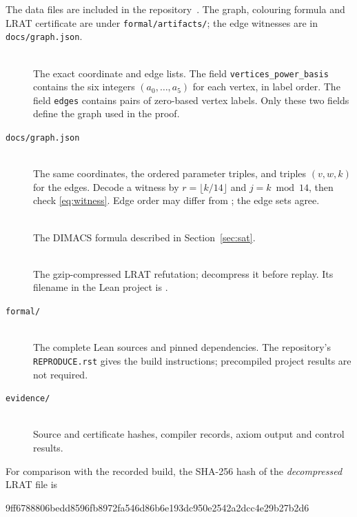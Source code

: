 \documentclass[11pt,a4paper]{article}
\theoremstyle{remark}
\newcommand{\code}[1]{\texttt{#1}}
\begin{document}
The data files are included in the repository~\cite{artifact}.
The graph, colouring formula and LRAT certificate are under
\code{formal/artifacts/}; the edge witnesses are in \code{docs/graph.json}.
\begin{description}
\item[]\hfill\\
The exact coordinate and edge lists.
The field \code{vertices\_power\_basis} contains the six integers
$(a_0,\ldots,a_5)$ for each vertex, in label order. The field \code{edges}
contains pairs of zero-based vertex labels. Only these two fields define
the graph used in the proof.
\item[\code{docs/graph.json}]\hfill\\
The same coordinates, the ordered
parameter triples, and triples $(v,w,k)$ for the edges. Decode a witness
by $r=\lfloor k/14\rfloor$ and $j=k\bmod14$, then check
\eqref{eq:witness}. Edge order may differ from ; the
edge sets agree.
\item[]\hfill\\
The DIMACS formula described in
Section~\ref{sec:sat}.
\item[]\hfill\\
The gzip-compressed LRAT refutation;
decompress it before replay. Its filename in the Lean project is
.
\item[\code{formal/}]\hfill\\
The complete Lean sources and pinned dependencies.
The repository's \code{REPRODUCE.rst} gives the build instructions;
precompiled project results are not required.
\item[\code{evidence/}]\hfill\\
Source and certificate hashes, compiler records,
axiom output and control results.
\end{description}

For comparison with the recorded build, the SHA-256 hash of the
\emph{decompressed} LRAT file is
\begin{center}\small\ttfamily
9ff6788806bedd8596fb8972fa546d86b6e193dc950e2542a2dcc4e29b27b2d6
\end{center}
\end{document}
